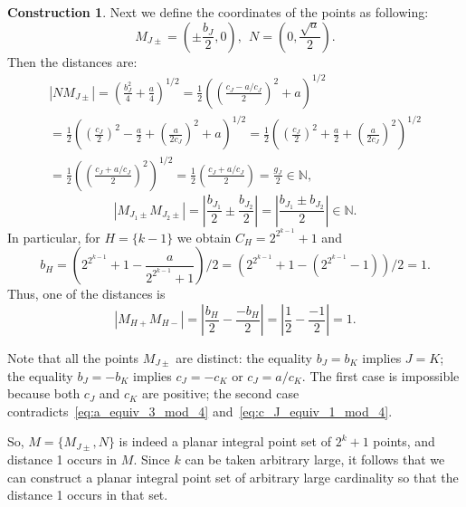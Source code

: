\documentclass[a4paper,14pt]{article} %
\theoremstyle{plain}
\theoremstyle{definition}
\newtheorem{construction}[theorem]{Construction}
\begin{document}
\begin{construction}
	Next we define the coordinates of the points as following:
	\begin{equation}
		M_{J\pm} =\left(\pm\frac{b_J}{2}, 0\right)
		,
		~~
		N   =\left(0, \frac{\sqrt{a}}{2}\right)
		.
	\end{equation}
	Then the distances are:
	\begin{multline}
		|N M_{J\pm}|
		=
		\left(\frac{b_J^2}{4} + \frac{a}{4}\right)^{1/2}
		=
		\frac{1}{2}\left(\left(\frac{c_J - a/c_J}{2}\right)^2 + a\right)^{1/2}
		\\=
		\frac{1}{2}\left( \left(\frac{c_J}{2}\right)^2 - \frac{a}{2} + \left(\frac{a}{2c_J}\right)^2 + a\right)^{1/2}
		=
		\frac{1}{2}\left( \left(\frac{c_J}{2}\right)^2 + \frac{a}{2} + \left(\frac{a}{2c_J}\right)^2    \right)^{1/2}
		\\=
		\frac{1}{2}\left(\left(\frac{c_J + a/c_J}{2}\right)^2\right)^{1/2}
		=
		\frac{1}{2}\left(\frac{c_J + a/c_J}{2}\right)
		=
		\frac{g_J}{2}
		\in\mathbb{N}
		,
	\end{multline}
	\begin{equation}
		|M_{J_1 \pm}  M_{J_2 \pm}|
		=
		\left|\frac{b_{J_1}}{2} \pm \frac{b_{J_2}}{2}\right|
		=
		\left|\frac{b_{J_1} \pm b_{J_2}}{2}\right|
		\in\mathbb{N}
		.
	\end{equation}
	In particular, for $H = \{k-1\}$ we obtain $C_H = 2^{2^{k-1}}+1$ and
	\begin{equation}
		b_H =
		\left( 2^{2^{k-1}}+1 - \frac{a}{2^{2^{k-1}}+1} \right)/2
		=
		\left(2^{2^{k-1}}+1 - \left(  2^{2^{k-1}}-1 \right) \right)/2
		=
		1
		.
	\end{equation}
	Thus, one of the distances is
	\begin{equation}
		|M_{H+}  M_{H-}|
		=
		\left|\frac{b_{H}}{2} - \frac{-b_{H}}{2}\right|
		=
		\left|\frac{1}{2} - \frac{-1}{2}\right|
		= 1
		.
	\end{equation}

	Note that all the points $M_{J\pm}$ are distinct:
	the equality $b_J =  b_K$ implies $J=K$;
	the equality $b_J = -b_K$ implies $c_J = -c_K$ or $c_J = a / c_K$.
	The first case is impossible because both $c_J$ and $c_K$ are positive;
	the second case contradicts~\eqref{eq:a_equiv_3_mod_4} and~\eqref{eq:c_J_equiv_1_mod_4}.


	So, $M = \{ M_{J\pm}, N\}$ is indeed a planar integral point set of $2^k+1$ points,
	and distance 1 occurs in $M$.
	Since $k$ can be taken arbitrary large, it follows that we can construct
	a planar integral point set of arbitrary large cardinality so that the distance 1 occurs in that set.
\end{construction}
\end{document}
